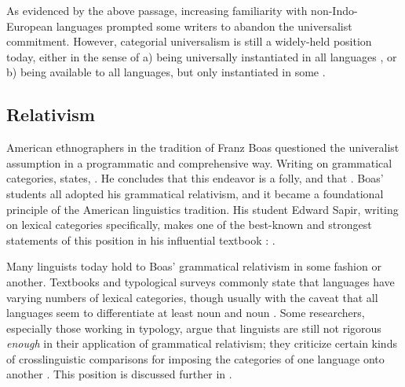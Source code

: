 As evidenced by the above passage, increasing familiarity with non-Indo-European languages prompted some writers to abandon the universalist commitment. However, categorial universalism is still a widely-held position today, either in the sense of a) being universally instantiated in all languages , or b) being available to all languages, but only instantiated in some .

\subsection{Relativism}
\label{sec:2.2.2}

American ethnographers in the tradition of Franz Boas questioned the univeralist assumption in a programmatic and comprehensive way. Writing on grammatical categories, \citeauthor{Boas1911} states, . He concludes that this endeavor is a folly, and that . Boas' students all adopted his grammatical relativism, and it became a foundational principle of the American linguistics tradition. His student Edward Sapir, writing on lexical categories specifically, makes one of the best-known and strongest statements of this position in his influential textbook : .

Many linguists today hold to Boas' grammatical relativism in some fashion or another. Textbooks and typological surveys commonly state that languages have varying numbers of lexical categories, though usually with the caveat that all languages seem to differentiate at least noun and noun \parencite[e.g.][§6.2]{Velupillai2012}. Some researchers, especially those working in typology, argue that linguists are still not rigorous \emph{enough} in their application of grammatical relativism; they criticize certain kinds of crosslinguistic comparisons for imposing the categories of one language onto another \parencites{Croft2001}{Haspelmath2010}{LaPolla2016} . This position is discussed further in .

